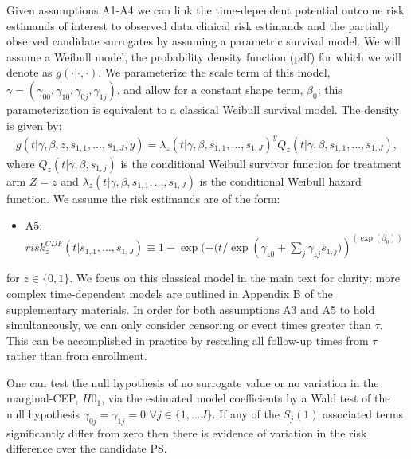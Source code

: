 \documentclass[times, doublespace]{simauth}
\begin{document}
Given assumptions A1-A4 we can link the time-dependent potential outcome risk estimands of interest to observed data clinical risk estimands and the partially observed candidate surrogates by assuming a parametric survival model. We will assume a Weibull model, the probability density function (pdf) for which we will denote as $g(\cdot|\cdot,\cdot)$. We parameterize the scale term of this model, $\gamma=(\gamma_{00}, \gamma_{10},\gamma_{0j}, \gamma_{1j})$, and allow for a constant shape term, $\beta_{0}$; this parameterization is equivalent to a classical Weibull survival model. The density is given by:
\begin{eqnarray*}
g(t|\gamma, \beta, z, s_{1,1}, \ldots,s_{1,J}, y)=\lambda_z(t|\gamma, \beta, s_{1,1}, \ldots, s_{1,J})^{y} Q_z(t|\gamma, \beta, s_{1,1}, \ldots, s_{1,J}),
\end{eqnarray*}
where $Q_z(t|\gamma, \beta, s_{1,j})$ is the conditional Weibull survivor function for treatment arm $Z=z$ and $\lambda_z(t|\gamma, \beta, s_{1,1}, \ldots, s_{1,J})$ is the conditional Weibull hazard function. We assume the risk estimands are of the form:
\begin{itemize}
\item A5: $risk_{z}^{CDF}(t|s_{1,1}, \ldots, s_{1,J}) \equiv 1-\exp(-(t/\exp(\gamma_{z0}+\sum_j{\gamma_{zj}s_{1,j})})^{(\exp(\beta_{0}))}$
\end{itemize}
for $z\in \{0,1\}$. We focus on this classical model in the main text for clarity; more complex time-dependent models are outlined in Appendix B of the supplementary materials. In order for both assumptions A3 and A5 to hold simultaneously, we can only consider censoring or event times greater than $\tau$. This can be accomplished in practice by rescaling all follow-up times from $\tau$ rather than from enrollment.

One can test the null hypothesis of no surrogate value or no variation in the marginal-CEP, $H0_1$, via the estimated model coefficients by a Wald test of the null hypothesis $\gamma_{0j}=\gamma_{1j}=0$ $\forall j \in \{1,\ldots J\}$. If any of the $S_{j}(1)$ associated terms significantly differ from zero then there is evidence of variation in the risk difference over the candidate PS. 
\end{document}
